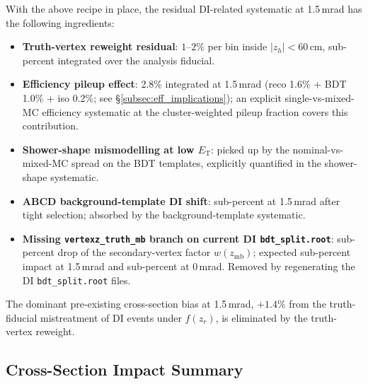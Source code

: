 \documentclass[11pt,a4paper]{article}
\newcommand{\ET}{\ensuremath{E_{\text{T}}}\xspace}
\begin{document}
With the above recipe in place, the residual DI-related
systematic at 1.5\,mrad has the following ingredients:

\begin{itemize}
\item \textbf{Truth-vertex reweight residual}: $1$--$2\%$ per bin
  inside $|z_h|<60$\,cm, sub-percent integrated over the analysis
  fiducial.
\item \textbf{Efficiency pileup effect}: 2.8\% integrated at
  1.5\,mrad (reco 1.6\% + BDT 1.0\% + iso 0.2\%; see
  \S\ref{subsec:eff_implications}); an explicit
  single-vs-mixed-MC efficiency systematic at the cluster-weighted
  pileup fraction covers this contribution.
\item \textbf{Shower-shape mismodelling at low \ET}: picked up by
  the nominal-vs-mixed-MC spread on the BDT templates, explicitly
  quantified in the shower-shape systematic.
\item \textbf{ABCD background-template DI shift}: sub-percent at
  1.5\,mrad after tight selection; absorbed by the
  background-template systematic.
\item \textbf{Missing \texttt{vertexz\_truth\_mb} branch on current
  DI \texttt{bdt\_split.root}}: sub-percent drop of the
  secondary-vertex factor $w(z_\mathrm{mb})$;
  expected sub-percent impact at 1.5\,mrad and sub-percent at
  0\,mrad. Removed by regenerating the DI \texttt{bdt\_split.root}
  files.
\end{itemize}

The dominant pre-existing cross-section bias at 1.5\,mrad,
$+1.4\%$ from the truth-fiducial mistreatment of DI events under
$f(z_r)$, is eliminated by the truth-vertex reweight.

\subsection{Cross-Section Impact Summary}
\end{document}
